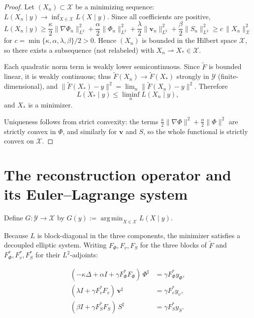 \documentclass[12pt, oneside]{memoir}
\DeclareMathOperator*{\argmin}{arg\,min}
\newcommand{\X}{\mathcal{X}}
\newcommand{\Ft}{\widetilde{F}}
\newcommand{\nnorm}[1]{\lVert #1 \rVert}
\newcommand{\bv}{\mathbf{v}}
\begin{document}
\begin{proof}
Let $(X_n) \subset \X$ be a minimizing sequence: $L(X_n \mid y) \to \inf_{X \in \X}
L(X \mid y)$.  Since all coefficients are positive,
\[
  L(X_n \mid y) \ge
  \frac{\kappa}{2}\nnorm{\nabla\Phi_n}_{L^2}^2
  + \frac{\alpha}{2}\nnorm{\Phi_n}_{L^2}^2
  + \frac{\lambda}{2}\nnorm{\bv_n}_{L^2}^2
  + \frac{\beta}{2}\nnorm{S_n}_{L^2}^2
  \ge c\, \nnorm{X_n}_\X^2
\]
for $c = \min\{\kappa,\alpha,\lambda,\beta\}/2 > 0$.  Hence $(X_n)$ is bounded in the
Hilbert space $\X$, so there exists a subsequence (not relabeled) with
$X_n \rightharpoonup X_* \in \X$.

Each quadratic norm term is weakly lower semicontinuous.  Since $\Ft$ is bounded linear,
it is weakly continuous; thus $\Ft(X_n) \to \Ft(X_*)$ strongly in $\mathcal{Y}$
(finite-dimensional), and
$\nnorm{\Ft(X_*) - y}^2 = \lim_n \nnorm{\Ft(X_n) - y}^2$.  Therefore
\[
  L(X_* \mid y) \le \liminf_n L(X_n \mid y),
\]
and $X_*$ is a minimizer.

Uniqueness follows from strict convexity: the terms $\frac{\kappa}{2}\nnorm{\nabla\Phi}^2
+ \frac{\alpha}{2}\nnorm{\Phi}^2$ are strictly convex in $\Phi$, and similarly for
$\bv$ and $S$, so the whole functional is strictly convex on $\X$.
\end{proof}

\section{The reconstruction operator and its Euler--Lagrange system}

\begin{definition}
\label{def:G}
Define $G: \mathcal{Y} \to \X$ by $G(y) := \argmin_{X \in \X} L(X \mid y)$.
\end{definition}

Because $L$ is block-diagonal in the three components, the minimizer satisfies a
decoupled elliptic system.  Writing $F_\Phi, F_v, F_S$ for the three blocks of $\Ft$
and $F_\Phi^*, F_v^*, F_S^*$ for their $L^2$-adjoints:

\begin{align}
  (-\kappa\Delta + \alpha I + \gamma F_\Phi^* F_\Phi)\,\Phi^\sharp
    &= \gamma F_\Phi^* y_\Phi, \label{eq:EL-phi}\\
  (\lambda I + \gamma F_v^* F_v)\,\bv^\sharp
    &= \gamma F_v^* y_v, \label{eq:EL-v}\\
  (\beta I + \gamma F_S^* F_S)\, S^\sharp
    &= \gamma F_S^* y_S. \label{eq:EL-S}
\end{align}
\end{document}
